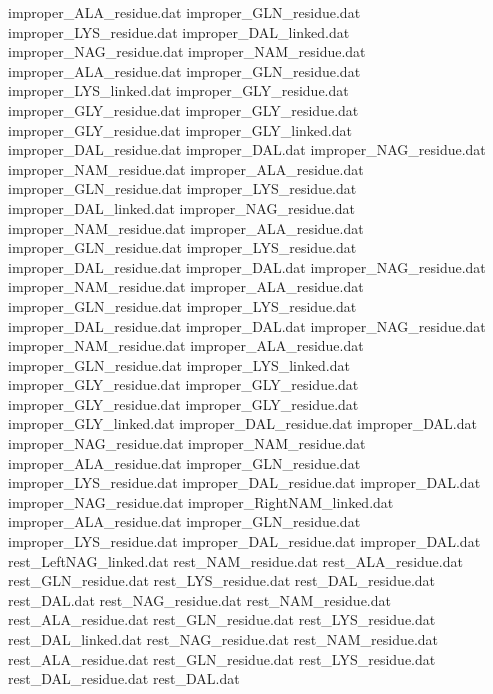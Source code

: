 improper_ALA_residue.dat        
improper_GLN_residue.dat        
improper_LYS_residue.dat        
improper_DAL_linked.dat         
improper_NAG_residue.dat        
improper_NAM_residue.dat        
improper_ALA_residue.dat        
improper_GLN_residue.dat        
improper_LYS_linked.dat         
improper_GLY_residue.dat
improper_GLY_residue.dat
improper_GLY_residue.dat
improper_GLY_residue.dat
improper_GLY_linked.dat
improper_DAL_residue.dat        
improper_DAL.dat                
improper_NAG_residue.dat        
improper_NAM_residue.dat        
improper_ALA_residue.dat        
improper_GLN_residue.dat        
improper_LYS_residue.dat        
improper_DAL_linked.dat         
improper_NAG_residue.dat        
improper_NAM_residue.dat        
improper_ALA_residue.dat        
improper_GLN_residue.dat        
improper_LYS_residue.dat        
improper_DAL_residue.dat        
improper_DAL.dat                
improper_NAG_residue.dat        
improper_NAM_residue.dat        
improper_ALA_residue.dat        
improper_GLN_residue.dat        
improper_LYS_residue.dat        
improper_DAL_residue.dat        
improper_DAL.dat                
improper_NAG_residue.dat        
improper_NAM_residue.dat        
improper_ALA_residue.dat        
improper_GLN_residue.dat        
improper_LYS_linked.dat         
improper_GLY_residue.dat
improper_GLY_residue.dat
improper_GLY_residue.dat
improper_GLY_residue.dat
improper_GLY_linked.dat
improper_DAL_residue.dat        
improper_DAL.dat                
improper_NAG_residue.dat        
improper_NAM_residue.dat        
improper_ALA_residue.dat        
improper_GLN_residue.dat        
improper_LYS_residue.dat        
improper_DAL_residue.dat        
improper_DAL.dat                
improper_NAG_residue.dat        
improper_RightNAM_linked.dat    
improper_ALA_residue.dat        
improper_GLN_residue.dat        
improper_LYS_residue.dat        
improper_DAL_residue.dat        
improper_DAL.dat                
rest_LeftNAG_linked.dat         
rest_NAM_residue.dat            
rest_ALA_residue.dat            
rest_GLN_residue.dat            
rest_LYS_residue.dat            
rest_DAL_residue.dat            
rest_DAL.dat                    
rest_NAG_residue.dat            
rest_NAM_residue.dat            
rest_ALA_residue.dat            
rest_GLN_residue.dat            
rest_LYS_residue.dat            
rest_DAL_linked.dat             
rest_NAG_residue.dat            
rest_NAM_residue.dat            
rest_ALA_residue.dat            
rest_GLN_residue.dat            
rest_LYS_residue.dat            
rest_DAL_residue.dat            
rest_DAL.dat                    
